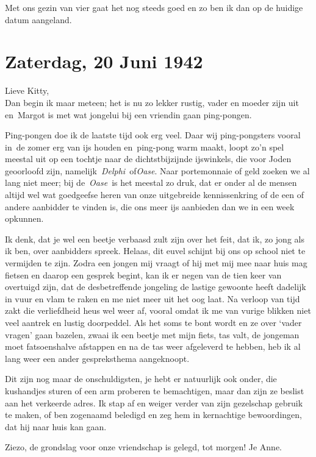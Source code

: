 \documentclass{book}
\begin{document}
Met ons gezin van vier gaat het nog steeds goed en zo ben ik dan op de huidige
datum aangeland.

\section*{Zaterdag, 20 Juni 1942}

Lieve Kitty,\\
 Dan begin ik maar meteen; het is nu zo lekker rustig, vader en
moeder zijn uit en~Margot is met wat jongelui bij een vriendin gaan ping-pongen.

Ping-pongen doe ik de laatste tijd ook erg veel. Daar wij ping-pongsters vooral
in~de zomer erg van ijs houden en~ping-pong warm maakt, loopt zo'n spel meestal
uit op een tochtje naar de dichtstbijzijnde ijswinkels, die voor Joden
geoorloofd zijn, namelijk~\emph{Delphi}~of\emph{Oase}. Naar portemonnaie of geld
zoeken we al lang niet meer; bij de~\emph{Oase}~is het meestal zo druk, dat er
onder al de mensen altijd wel wat goedgeefse heren van onze uitgebreide
kennissenkring of de een of andere aanbidder te vinden is, die ons meer ijs
aanbieden dan we in een week opkunnen.

Ik denk, dat je wel een beetje verbaasd zult zijn over het feit, dat ik, zo jong
als ik ben, over aanbidders spreek. Helaas, dit euvel schijnt bij ons op school
niet te vermijden te zijn. Zodra een jongen mij vraagt of hij met mij mee naar
huis mag fietsen en daarop een gesprek begint, kan ik er negen van de tien keer
van overtuigd zijn, dat de desbetreffende jongeling de lastige gewoonte heeft
dadelijk in vuur en vlam te raken en me niet meer uit het oog laat. Na verloop
van tijd zakt die verliefdheid heus wel weer af, vooral omdat ik me van vurige
blikken niet veel aantrek en lustig doorpeddel. Als het soms te bont wordt en ze
over `vader vragen' gaan bazelen, zwaai ik een beetje met mijn fiets, tas valt,
de jongeman moet fatsoenshalve afstappen en na de tas weer afgeleverd te hebben,
heb ik al lang weer een ander gespreksthema aangeknoopt.

Dit zijn nog maar de onschuldigsten, je hebt er natuurlijk ook onder, die
kushandjes sturen of een arm proberen te bemachtigen, maar dan zijn ze beslist
aan het verkeerde adres. Ik stap af en weiger verder van zijn gezelschap gebruik
te maken, of ben zogenaamd beledigd en zeg hem in kernachtige bewoordingen, dat
hij naar huis kan gaan.

Ziezo, de grondslag voor onze vriendschap is gelegd, tot morgen! Je Anne.
\end{document}
